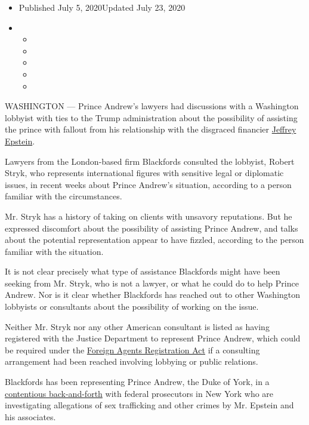 \begin{itemize}
\item
  Published July 5, 2020Updated July 23, 2020
\item
  \begin{itemize}
  \item
  \item
  \item
  \item
  \item
  \end{itemize}
\end{itemize}

WASHINGTON --- Prince Andrew's lawyers had discussions with a Washington
lobbyist with ties to the Trump administration about the possibility of
assisting the prince with fallout from his relationship with the
disgraced financier
\href{https://www.nytimes.com/2020/07/23/nyregion/jeffrey-epstein-address-homes.html}{Jeffrey
Epstein}.

Lawyers from the London-based firm Blackfords consulted the lobbyist,
Robert Stryk, who represents international figures with sensitive legal
or diplomatic issues, in recent weeks about Prince Andrew's situation,
according to a person familiar with the circumstances.

Mr. Stryk has a history of taking on clients with unsavory reputations.
But he expressed discomfort about the possibility of assisting Prince
Andrew, and talks about the potential representation appear to have
fizzled, according to the person familiar with the situation.

It is not clear precisely what type of assistance Blackfords might have
been seeking from Mr. Stryk, who is not a lawyer, or what he could do to
help Prince Andrew. Nor is it clear whether Blackfords has reached out
to other Washington lobbyists or consultants about the possibility of
working on the issue.

Neither Mr. Stryk nor any other American consultant is listed as having
registered with the Justice Department to represent Prince Andrew, which
could be required under the
\href{https://www.nytimes.com/2019/03/06/us/politics/fara-task-force-justice-department.html}{Foreign
Agents Registration Act} if a consulting arrangement had been reached
involving lobbying or public relations.

Blackfords has been representing Prince Andrew, the Duke of York, in a
\href{https://www.nytimes.com/2020/06/08/nyregion/jeffrey-epstein-prince-andrew.html}{contentious
back-and-forth} with federal prosecutors in New York who are
investigating allegations of sex trafficking and other crimes by Mr.
Epstein and his associates.

